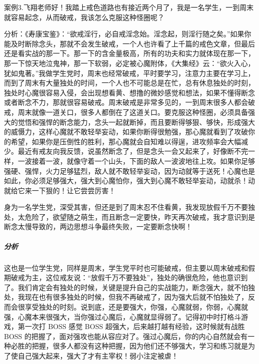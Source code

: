 案例3.飞翔老师好！我踏上戒色道路也有接近两个月了，我是一名学生，一到周末就容易起念，从而破戒，我该怎么克服这种怪圈呢？

分析：《寿康宝鉴》：“欲戒淫行，必自戒淫念始。淫念起，则淫行随之矣。”如果你能及时断除念头，那就不会发生破戒，一个人也许看了上千篇的戒色文章，但最后还是看实战的那一下。那一下的含金量极高，所有的功夫和实力就体现在那一下，那一下惊天地泣鬼神，那一下软弱，必定被心魔附体，《大集经》云：“欲火入心，犹如鬼著。”我做学生党时，周末也经常破戒，平时要学习，注意力主要在学习上，而到了周末有大量独处的时间，一个人也不可能总是在忙，总有休息独处的时刻，独处时心魔很容易入侵，会出现想看黄、想撸的微妙感觉和想法，如果不懂得断念或者断念不力，那就很容易破戒。周末破戒是非常多见的，一到周末很多人都会破戒，周末就像一道关口，很多人都倒在了这道关口。要克服这种怪圈，必须具备强大的觉悟和强悍的断念能力，念头一起就断掉，而且要断得够狠、够快，形成强大的威慑力，这样心魔就不敢轻举妄动，如果你断得很勉强，那心魔就看到了攻破你的希望，如果你是压倒性的胜利，那心魔就会自知难以得逞，进攻频率会大幅减少。最近有戒友向我反馈，说虽然断念了，但是念头一会又起来了，好像断不完一样，一波接着一波，就像守着一个山头，下面的敌人一波波地往上攻。如果你足够强硬、强悍，火力足够猛烈，敌人就不敢轻举妄动，因为动就等于送死！心魔也是如此，你必须足够强大，强大到心魔怕你，强大到心魔不敢轻举妄动，动就杀！动就给它来一下狠的！让它尝尝厉害！

\begin{case}[做好慎独]
    身为一名学生党，深受其害，但还是到了周末忍不住看黄，我发现放假千万不要独处，太危险了，欲望随之萌生，而且断念一定要快，昨天再次破戒，我才意识到是断念太慢导致的，两边思想斗争最终失败，一定要断念快啊！
    \subparagraph{分析} 这也是一位学生党，同样是周末，学生党平时也可能破戒，但主要以周末破戒和假期破戒为主，这位戒友说：“放假千万不要独处”，独处的确很危险，他也意识到了。我们肯定会有独处的时候，关键是提升自己的实战能力，断念强大，就不怕独处，我现在也有很多独处的时候，但我不再破戒了，因为强大后就不怕独处了，反而会很享受独处的时刻。说到底，还是要强大，你强，心魔就弱，你弱，心魔就强，心魔本来很强大，当你强过心魔后，心魔就显得弱了。记得初中时打格斗游戏，第一次打 BOSS 感觉 BOSS 超强大，后来越打越有经验，这时候就有战胜 BOSS 的把握了，面对强攻也能从容应对了。强过心魔后，你的内心自然就会有一种必胜的把握，很多人都没有这种把握，因为他们还不够强大，学习和练习就是为了使自己强大起来，强大了才有主宰权！弱小注定被虐！
\end{case}

